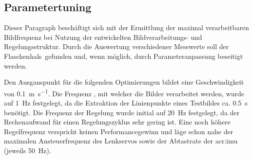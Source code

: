 \subsection{Parametertuning}
Dieser Paragraph beschäftigt sich mit der Ermittlung der maximal verarbeitbaren Bildfrequenz bei Nutzung der entwickelten Bildverarbeitungs- und Regelungsstruktur. Durch die Auswertung verschiedener Messwerte soll der \glqq Flaschenhals\grqq\ gefunden und, wenn möglich, durch Parameteranpassung beseitigt werden.


Den Ausganspunkt für die folgenden Optimierungen bildet eine Geschwindigkeit von
\SI{0.1}{\metre\per\second}. Die Frequenz , mit welcher die Bilder verarbeitet werden, wurde auf \SI{1}{\hertz} festgelegt, da die Extraktion der Linienpunkte eines Testbildes ca. \SI{0.5}{\second} benötigt. Die Frequenz der Regelung  wurde initial auf \SI{20}{\hertz} festgelegt, da der Rechenaufwand für einen Regelungszyklus sehr gering ist. Eine noch höhere Regelfrequenz verspricht keinen Performancegewinn und läge schon nahe der maximalen Ansteuerfrequenz des Lenkservos sowie der Abtastrate der \gls{acr:imu} (jeweils \SI{50}{\hertz}).

